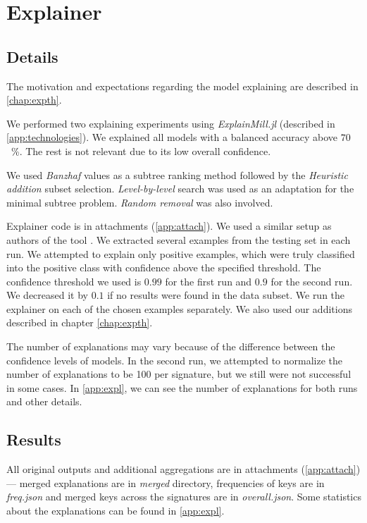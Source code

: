 \section{Explainer}
\subsection{Details}
The motivation and expectations regarding the model explaining are described in \ref{chap:expth}.

We performed two explaining experiments using \emph{ExplainMill.jl} (described in \ref{app:technologies}). We explained all models with a balanced accuracy above $70$~\%.  The rest is not relevant due to its low overall confidence.

We used \emph{Banzhaf} values as a subtree ranking method followed by the \emph{Heuristic addition} subset selection. \emph{Level-by-level} search was used as an adaptation for the minimal subtree problem. \emph{Random removal} was also involved.

Explainer code is in attachments (\ref{app:attach}). We used a similar setup as authors of the tool \cite{Pevny2020}. We extracted several examples from the testing set in each run. We attempted to explain only positive examples, which were truly classified into the positive class with confidence above the specified threshold. The confidence threshold we used is $0.99$ for the first run and $0.9$ for the second run. We decreased it by $0.1$ if no results were found in the data subset. We run the explainer on each of the chosen examples separately. We also used our additions described in chapter \ref{chap:expth}.

The number of explanations may vary because of the difference between the confidence levels of models. In the second run, we attempted to normalize the number of explanations to be 100 per signature, but we still were not successful in some cases.  In \ref{app:expl}, we can see the number of explanations for both runs and other details.

\subsection{Results}
All original outputs and additional aggregations are in attachments (\ref{app:attach}) --- merged explanations are in \emph{merged} directory, frequencies of keys are in \emph{freq.json} and merged keys across the signatures are in \emph{overall.json}. Some statistics about the explanations can be found in \ref{app:expl}.

